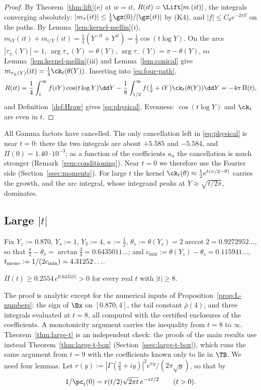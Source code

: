 \begin{proof}
By Theorem~\ref{thm:lift}(e) at $w=it$, $R(it)=\Lift[m_\cdot(it)]$, the integrals converging absolutely: $|m_\tau(it)|\le\frac14\gz(0)/|\gz(it)|$ by (K4),
and $|f|\le C_0e^{-2\pi Y}$ on the paths. By Lemma~\ref{lem:kernel-mellin}(i), $m_{iY}(it)+m_{i/Y}(it)=\frac14(Y^{-it}+Y^{it})=\frac12\cos(t\log Y)$. On the arcs
$|\tau_\pm(Y)|=1$, $\arg\tau_+(Y)=\theta(Y)$, $\arg\tau_-(Y)=\pi-\theta(Y)$, so Lemma~\ref{lem:kernel-mellin}(iii) and Lemma~\ref{lem:conical} give
$m_{\tau_\pm(Y)}(it)=\frac14\ck_t(\theta(Y))$. Inserting into \eqref{eq:four-path},
\[
R(it)=\frac14\int_1^\infty f(iY)\cos(t\log Y)\dd Y-\frac18\int_{1/2}^\infty f(\tfrac12+iY)\ck_t(\theta(Y))\dd Y=-4\pi\,\Pi(t),
\]
and Definition~\ref{def:Hraw} gives \eqref{eq:physical}. Evenness: $\cos(t\log Y)$ and $\ck_t$ are even in $t$.
\end{proof}

All Gamma factors have cancelled. The only cancellation left in \eqref{eq:physical} is near $t=0$: there the two integrals are about $+5.585$
and $-5.584$, and $\Pi(0)=1.40\cdot10^{-3}$; as a function of the coefficients $a_n$ the cancellation is much stronger
(Remark~\ref{rem:conditioning}). Near $t=0$ we therefore use the Fourier side (Section~\ref{ssec:moments}). For large $t$ the kernel
$\ck_t(\theta)\approx\frac12e^{t(\pi/2-\theta)}$ carries the growth, and the arc integral, whose integrand peaks at $Y\approx\sqrt{t/2\pi}$,
dominates.

\subsection{Large \texorpdfstring{$|t|$}{|t|}}

Fix $Y_z:=0.870$, $Y_s:=1$, $Y_3:=4$, $\kappa:=\frac12$, $\theta_s:=\theta(Y_s)=2\operatorname{arccot}2=0.9272952\ldots$, so that
$\frac\pi2-\theta_s=\arctan\frac34=0.6435011\ldots$; and $c_{\min}:=\theta(Y_z)-\theta_s=0.115941\ldots$, $t_{\rm mono}:=1/(2c_{\min})=4.31252\ldots$.

\begin{theorem}[Large $|t|$]\label{thm:large-t}
$\Pi(t)\ge0.2554\,e^{0.6435|t|}>0$ for every real $t$ with $|t|\ge8$.
\end{theorem}

The proof is analytic except for the numerical inputs of Proposition~\ref{prop:L-numbers}: the sign of $\Bx$ on $[0.870,4]$, the tail constant
$\bar\rho(4)$, and three integrals evaluated at $t=8$, all computed with the certified enclosures of the coefficients. A monotonicity argument
carries the inequality from $t=8$ to $\infty$. Theorem~\ref{thm:large-t} is an independent check: the proofs of the main results use instead
Theorem~\ref{thm:large-t-box} (Section~\ref{ssec:large-t-box}), which runs the same argument from $t=9$ with the coefficients known only to lie
in $\TB$. We need four lemmas. Let $r(y):=|\Gamma(\frac34+iy)|^2e^{\pi y}/(2\pi\sqrt y)$, so that by
\cite[14.5.1]{DLMF}
\begin{equation}\label{eq:P0}
1/\pc_t(0)=r(t/2)\sqrt{2\pi t}\,e^{-\pi t/2}\qquad(t>0).
\end{equation}

